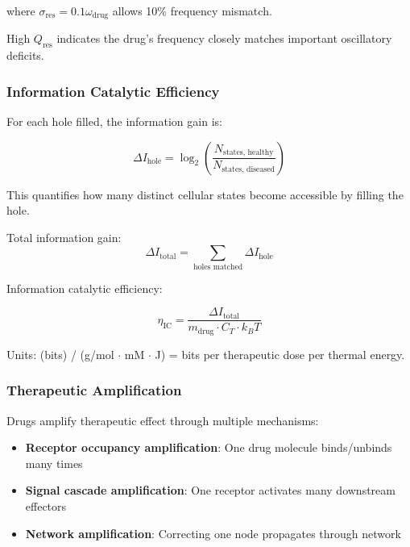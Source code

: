 \documentclass{article}
\begin{document}
where $\sigma_{\text{res}} = 0.1 \omega_{\text{drug}}$ allows 10\% frequency mismatch.

High $Q_{\text{res}}$ indicates the drug's frequency closely matches important oscillatory deficits.

\subsubsection{Information Catalytic Efficiency}

For each hole filled, the information gain is:

\begin{equation}
\Delta I_{\text{hole}} = \log_2\left(\frac{N_{\text{states, healthy}}}{N_{\text{states, diseased}}}\right)
\end{equation}

This quantifies how many distinct cellular states become accessible by filling the hole.

Total information gain:
\begin{equation}
\Delta I_{\text{total}} = \sum_{\text{holes matched}} \Delta I_{\text{hole}}
\end{equation}

Information catalytic efficiency:

\begin{equation}
\eta_{\text{IC}} = \frac{\Delta I_{\text{total}}}{m_{\text{drug}} \cdot C_T \cdot k_B T}
\end{equation}

Units: (bits) / (g/mol $\cdot$ mM $\cdot$ J) = bits per therapeutic dose per thermal energy.

\subsubsection{Therapeutic Amplification}

Drugs amplify therapeutic effect through multiple mechanisms:

\begin{itemize}
    \item \textbf{Receptor occupancy amplification}: One drug molecule binds/unbinds many times
    \item \textbf{Signal cascade amplification}: One receptor activates many downstream effectors
    \item \textbf{Network amplification}: Correcting one node propagates through network
\end{itemize}
\end{document}
